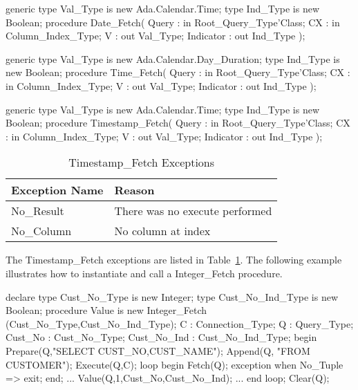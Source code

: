 \documentclass[english,letterpaper]{book}
\begin{document}
\begin{Code}
generic
   type Val_Type is new Ada.Calendar.Time;
   type Ind_Type is new Boolean;
procedure Date_Fetch(
   Query :     in     Root_Query_Type'Class;
   CX :        in     Column_Index_Type;
   V :            out Val_Type;
   Indicator :    out Ind_Type
);
\end{Code}

\begin{Code}
generic
   type Val_Type is new Ada.Calendar.Day_Duration;
   type Ind_Type is new Boolean;
procedure Time_Fetch(
   Query :     in     Root_Query_Type'Class;
   CX :        in     Column_Index_Type;
   V :            out Val_Type;
   Indicator :    out Ind_Type
);
\end{Code}

\begin{Code}
generic
   type Val_Type is new Ada.Calendar.Time;
   type Ind_Type is new Boolean;
procedure Timestamp_Fetch(
   Query :     in     Root_Query_Type'Class;
   CX :        in     Column_Index_Type;
   V :            out Val_Type;
   Indicator :    out Ind_Type
);
\end{Code}

\begin{table}
   \begin{center}
      \begin{tabular}{ll}
         Exception Name    &  Reason\\
         \hline      
         No\_Result        &  There was no execute performed\\
         No\_Column        &  No column at index\\
      \end{tabular}
   \end{center}
   \caption{Timestamp\_Fetch Exceptions}\label{t:tfx2}
\end{table}

The Timestamp\_Fetch exceptions are listed in Table~\ref{t:tfx2}.
The following example illustrates how to instantiate and call a
Integer\_Fetch procedure.

\begin{Example}
declare
   type Cust_No_Type is new Integer;
   type Cust_No_Ind_Type is new Boolean;
   procedure Value is new Integer_Fetch
      (Cust_No_Type,Cust_No_Ind_Type);
   C :              Connection_Type;
   Q :              Query_Type;
   Cust_No :        Cust_No_Type;
   Cust_No_Ind :    Cust_No_Ind_Type;
begin
   Prepare(Q,"SELECT CUST_NO,CUST_NAME");
   Append(Q, "FROM CUSTOMER");
   Execute(Q,C);
   loop
      begin
         Fetch(Q);
      exception
         when No_Tuple =>
            exit;
      end;
      ...
      Value(Q,1,Cust_No,Cust_No_Ind);
      ...
   end loop;
   Clear(Q);
\end{Example}
\end{document}
